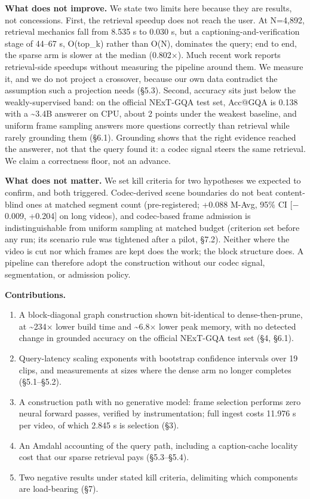 \documentclass[sigconf,review,anonymous]{acmart}
\providecommand{\tightlist}{\setlength{\itemsep}{0pt}\setlength{\parskip}{0pt}}
\begin{document}
\textbf{What does not improve.} We state two limits here because they are results, not
concessions. First, the retrieval speedup does not reach the user. At N=4,892, retrieval
mechanics fall from 8.535 s to 0.030 s, but a captioning-and-verification stage of 44--67 s,
O(top\_k) rather than O(N), dominates the query; end to end, the sparse arm is slower at the
median (0.802\ensuremath{\times}). Much recent work reports retrieval-side speedups without measuring the
pipeline around them. We measure it, and we do not project a crossover, because our own
data contradict the assumption such a projection needs (§5.3). Second, accuracy sits just below
the weakly-supervised band: on the official NExT-GQA test set, Acc@GQA is 0.138 with a
\textasciitilde3.4B answerer on CPU, about 2 points under the weakest baseline, and uniform frame
sampling answers more questions correctly than retrieval while rarely grounding them (§6.1).
Grounding shows that the right evidence reached the answerer, not that the query found it: a
codec signal steers the same retrieval. We claim a correctness floor, not an advance.

\textbf{What does not matter.} We set kill criteria for two hypotheses we expected to confirm,
and both triggered. Codec-derived scene boundaries do not beat content-blind ones at matched
segment count (pre-registered; +0.088 M-Avg, 95\% CI {[}\ensuremath{-}0.009, +0.204{]} on long videos), and
codec-based frame admission is indistinguishable from uniform sampling at matched budget
(criterion set before any run; its scenario rule was tightened after a pilot, §7.2). Neither where the
video is cut nor which frames are kept does the work; the block structure does. A pipeline
can therefore adopt the construction without our codec signal, segmentation, or admission
policy.

\textbf{Contributions.}

\begin{enumerate}
\def\labelenumi{\arabic{enumi}.}
\tightlist
\item
  A block-diagonal graph construction shown bit-identical to dense-then-prune, at \textasciitilde234\ensuremath{\times}
  lower build time and \textasciitilde6.8\ensuremath{\times} lower peak memory, with no detected change in grounded accuracy
  on the official NExT-GQA test set (§4, §6.1).
\item
  Query-latency scaling exponents with bootstrap confidence intervals over 19 clips, and
  measurements at sizes where the dense arm no longer completes (§5.1--§5.2).
\item
  A construction path with no generative model: frame selection performs zero neural
  forward passes, verified by instrumentation; full ingest costs 11.976 s per
  video, of which 2.845 s is selection (§3).
\item
  An Amdahl accounting of the query path, including a caption-cache locality cost that our
  sparse retrieval pays (§5.3--§5.4).
\item
  Two negative results under stated kill criteria, delimiting which components are
  load-bearing (§7).
\end{enumerate}
\end{document}
